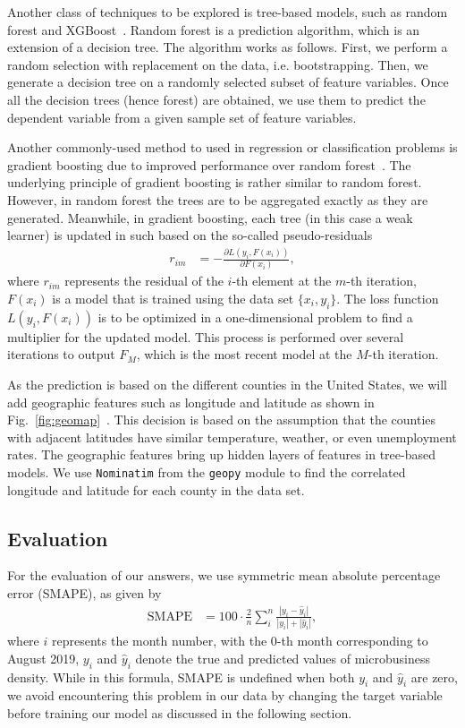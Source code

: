 \documentclass[prl,aps,superscriptaddress,twocolumn,10pt,nolongbibliography]{revtex4-2}
\begin{document}
Another class of techniques to be explored is tree-based models, such as random forest and XGBoost~\cite{chen2016xgboost}.
Random forest is a prediction algorithm, which is an extension of a decision tree. 
The algorithm works as follows. First, we perform a random selection with replacement on the data, i.e. bootstrapping. 
Then, we generate a decision tree on a randomly selected subset of feature variables. 
Once all the decision trees (hence forest) are obtained, we use them to predict the dependent variable from a given sample set of feature variables.

Another commonly-used method to used in regression or classification problems is gradient boosting due to improved performance over random forest~\cite{piryonesi2020data,hastie2009elements}.
The underlying principle of gradient boosting is rather similar to random forest. 
However, in random forest the trees are to be aggregated exactly as they are generated. 
Meanwhile, in gradient boosting, each tree (in this case a weak learner) is updated in such based on the so-called pseudo-residuals
\begin{align}
r_{im} &= -\frac{\partial L(y_i, F(x_i))}{\partial F(x_i)},
\end{align}
where $r_{im}$ represents the residual of the $i$-th element at the $m$-th iteration, $F(x_i)$ is a model that is trained using the data set $\{x_i, y_i\}$.
The loss function $L(y_i, F(x_i))$ is to be optimized in a one-dimensional problem to find a multiplier for the updated model.
This process is performed over several iterations to output $F_M$, which is the most recent model at the $M$-th iteration.

As the prediction is based on the different counties in the United States, we will add geographic features such as longitude and latitude as shown in Fig.~\ref{fig:geomap}~\cite{geomap}. 
This decision is based on the assumption that the counties with adjacent latitudes have similar temperature, weather, or even unemployment rates. 
The geographic features bring up hidden layers of features in tree-based models.
We use \texttt{Nominatim} from the \texttt{geopy} module to find the correlated longitude and latitude for each county in the data set.

\subsection{Evaluation}
For the evaluation of our answers, we use symmetric mean absolute percentage error (SMAPE), as given by
\begin{align}
\textrm{SMAPE} &= 100 \cdot \frac{2}{n} \sum_{i}^n \frac{|y_i - \hat{y}_i|}{|y_i| + |\hat{y}_i|},
\end{align}
where $i$ represents the month number, with the 0-th month corresponding to August 2019, $y_i$ and $\hat{y}_i$ denote the true and predicted values of microbusiness density.
While in this formula, SMAPE is undefined when both $y_i$ and $\hat{y}_i$ are zero, we avoid encountering this problem in our data by changing the target variable before training our model as discussed in the following section.
\end{document}
